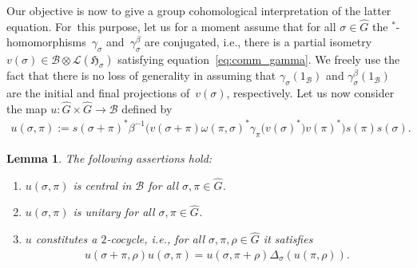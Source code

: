 \documentclass[10pt,a4paper]{amsart}
\numberwithin{equation}{section}
\newtheorem{Lemma}[Theorem]{Lemma}
\newcommand*{\tensor}{\otimes}		%
\newcommand*{\Star}{$^*$\nobreakdash}
\newcommand*{\hilb}{\mathfrak}		%
\newcommand*{\alg}{\mathcal}		%
\newcommand*{\hH}{\hilb{H}}			%
\newcommand*{\one}{1}				%
\newcommand*{\aB}{\alg{B}} 			%
\newcommand*{\End}{\mathcal{L}} %
\begin{document}
Our objective is now to give a group cohomological interpretation of the latter equation.
For~this purpose, let us for a moment assume that for all $\sigma \in \hat G$ the \Star-homomorphisms~$\gamma_\sigma$ and~$\gamma_\sigma^\beta$ are conjugated, i.e., there is a partial isometry $v(\sigma) \in \aB \tensor \End(\hH_\sigma)$ satisfying equation~\eqref{eq:comm_gamma}.
We freely use the fact that there is no loss of generality in assuming that $\gamma_\sigma(\one_\aB)$ and $\gamma_\sigma^\beta(\one_\aB)$ are the initial and final projections of~$v(\sigma)$, respectively.
Let us now consider the map $u\colon \hat G \times \hat G \to \aB$ defined by
\begin{gather}\label{eq:unitary_central_element}
	u(\sigma, \pi)
	:=
	s(\sigma + \pi)^* \beta^{-1}\big( v(\sigma + \pi) \omega(\pi,\sigma)^* \gamma_\pi\big(v(\sigma)^*\big) v(\pi)^*\big) s(\pi) s(\sigma).
\end{gather}

\begin{Lemma}\label{lem:unitary_central_cocycle}
	The following assertions hold:
	\begin{enumerate}\itemsep=0pt
	\item[$1.$]
		$u(\sigma, \pi)$ is central in $\aB$ for all $\sigma, \pi \in \hat G$.
	\item[$2.$]
		$u(\sigma, \pi)$ is unitary for all $\sigma, \pi \in \hat G$.
	\item[$3.$]
		$u$ constitutes a $2$-cocycle, i.e., for all $\sigma, \pi, \rho \in \hat G$ it satisfies
		\begin{gather*}%
			u(\sigma + \pi, \rho) u(\sigma, \pi)
			= u(\sigma, \pi + \rho) \Delta_\sigma ( u(\pi, \rho) ).
		\end{gather*}
	\end{enumerate}
\end{Lemma}
\end{document}
